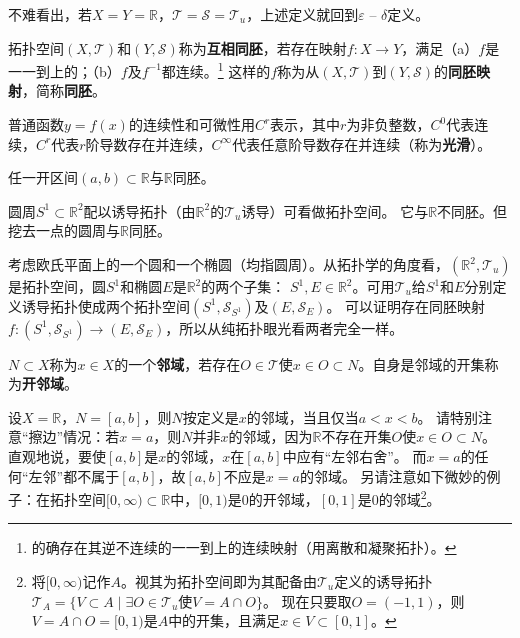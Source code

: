 \begin{note}
	不难看出，若$X = Y = \mathbb{R}$，$\mathscr{T} = \mathscr{S} = \mathscr{T}_u$，上述定义就回到$\varepsilon$ -- $\delta$定义。
\end{note}

\begin{definition}
	拓扑空间$(X, \mathscr{T})$和$(Y, \mathscr{S})$称为\textbf{互相同胚}，若存在映射$f \colon X \to Y$，满足（a）$f$是一一到上的；（b）$f$及$f^{-1}$都连续。\footnote{
		的确存在其逆不连续的一一到上的连续映射（用离散和凝聚拓扑）。
	}
	这样的$f$称为从$(X, \mathscr{T})$到$(Y, \mathscr{S})$的\textbf{同胚映射}，简称\textbf{同胚}。
\end{definition}

普通函数$y = f(x)$的连续性和可微性用$C^r$表示，其中$r$为非负整数，$C^0$代表连续，$C^r$代表$r$阶导数存在并连续，$C^\infty$代表任意阶导数存在并连续（称为\textbf{光滑}）。

\begin{example}
	任一开区间$(a, b) \subset \mathbb{R}$与$\mathbb{R}$同胚。
\end{example}

\begin{example}
	圆周$S^1 \subset \mathbb{R}^2$配以诱导拓扑（由$\mathbb{R}^2$的$\mathscr{T}_u$诱导）可看做拓扑空间。
	它与$\mathbb{R}$不同胚。但挖去一点的圆周与$\mathbb{R}$同胚。
\end{example}

\begin{example}
	考虑欧氏平面上的一个圆和一个椭圆（均指圆周）。从拓扑学的角度看，$(\mathbb{R}^2, \mathscr{T}_u)$是拓扑空间，圆$S^1$和椭圆$E$是$\mathbb{R}^2$的两个子集：
	$S^1, E \in \mathbb{R}^2$。可用$\mathscr{T}_u$给$S^1$和$E$分别定义诱导拓扑使成两个拓扑空间$(S^1, \mathscr{S}_{S^1})$及$(E, \mathscr{S}_E)$。
	可以证明存在同胚映射$f \colon (S^1, \mathscr{S}_{S^1}) \to (E, \mathscr{S}_E)$，所以从纯拓扑眼光看两者完全一样。
\end{example}

\begin{definition}
	$N \subset X$称为$x \in X$的一个\textbf{邻域}，若存在$O \in \mathscr{T}$使$x \in O \subset N$。自身是邻域的开集称为\textbf{开邻域}。
\end{definition}

\begin{note}
	设$X = \mathbb{R}$，$N = [a, b]$，则$N$按定义是$x$的邻域，当且仅当$a < x < b$。
	请特别注意``擦边''情况：若$x = a$，则$N$并非$x$的邻域，因为$\mathbb{R}$不存在开集$O$使$x \in O \subset N$。
	直观地说，要使$[a, b]$是$x$的邻域，$x$在$[a, b]$中应有``左邻右舍''。
	而$x = a$的任何``左邻''都不属于$[a, b]$，故$[a, b]$不应是$x = a$的邻域。
	另请注意如下微妙的例子：在拓扑空间$[0, \infty) \subset \mathbb{R}$中，$[0, 1)$是$0$的开邻域，$[0, 1]$是$0$的邻域\footnote{
	将$[0, \infty)$记作$A$。视其为拓扑空间即为其配备由$\mathscr{T}_u$定义的诱导拓扑$\mathscr{T}_A = \{V \subset A \mid \exists O \in \mathscr{T}_u \text{使} V = A \cap O\}$。
	现在只要取$O = (-1, 1)$，则$V = A \cap O = [0, 1)$是$A$中的开集，且满足$x \in V \subset [0, 1]$。
	}。
\end{note}

